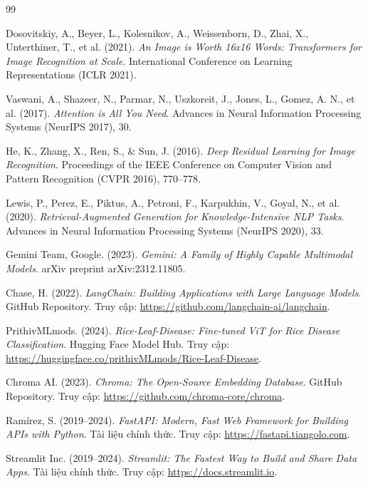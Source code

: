 \documentclass[13pt,a4paper]{extreport}
\begin{document}
\begin{thebibliography}{99}

Dosovitskiy, A., Beyer, L., Kolesnikov, A., Weissenborn, D., Zhai, X., Unterthiner, T., et al. (2021). \textit{An Image is Worth 16x16 Words: Transformers for Image Recognition at Scale}. International Conference on Learning Representations (ICLR 2021).

Vaswani, A., Shazeer, N., Parmar, N., Uszkoreit, J., Jones, L., Gomez, A. N., et al. (2017). \textit{Attention is All You Need}. Advances in Neural Information Processing Systems (NeurIPS 2017), 30.

He, K., Zhang, X., Ren, S., \& Sun, J. (2016). \textit{Deep Residual Learning for Image Recognition}. Proceedings of the IEEE Conference on Computer Vision and Pattern Recognition (CVPR 2016), 770--778.

Lewis, P., Perez, E., Piktus, A., Petroni, F., Karpukhin, V., Goyal, N., et al. (2020). \textit{Retrieval-Augmented Generation for Knowledge-Intensive NLP Tasks}. Advances in Neural Information Processing Systems (NeurIPS 2020), 33.

Gemini Team, Google. (2023). \textit{Gemini: A Family of Highly Capable Multimodal Models}. arXiv preprint arXiv:2312.11805.

Chase, H. (2022). \textit{LangChain: Building Applications with Large Language Models}. GitHub Repository. Truy cập: \url{https://github.com/langchain-ai/langchain}.

PrithivMLmods. (2024). \textit{Rice-Leaf-Disease: Fine-tuned ViT for Rice Disease Classification}. Hugging Face Model Hub. Truy cập: \url{https://huggingface.co/prithivMLmods/Rice-Leaf-Disease}.

Chroma AI. (2023). \textit{Chroma: The Open-Source Embedding Database}. GitHub Repository. Truy cập: \url{https://github.com/chroma-core/chroma}.

Ramírez, S. (2019--2024). \textit{FastAPI: Modern, Fast Web Framework for Building APIs with Python}. Tài liệu chính thức. Truy cập: \url{https://fastapi.tiangolo.com}.

Streamlit Inc. (2019--2024). \textit{Streamlit: The Fastest Way to Build and Share Data Apps}. Tài liệu chính thức. Truy cập: \url{https://docs.streamlit.io}.


\end{thebibliography}
\end{document}
